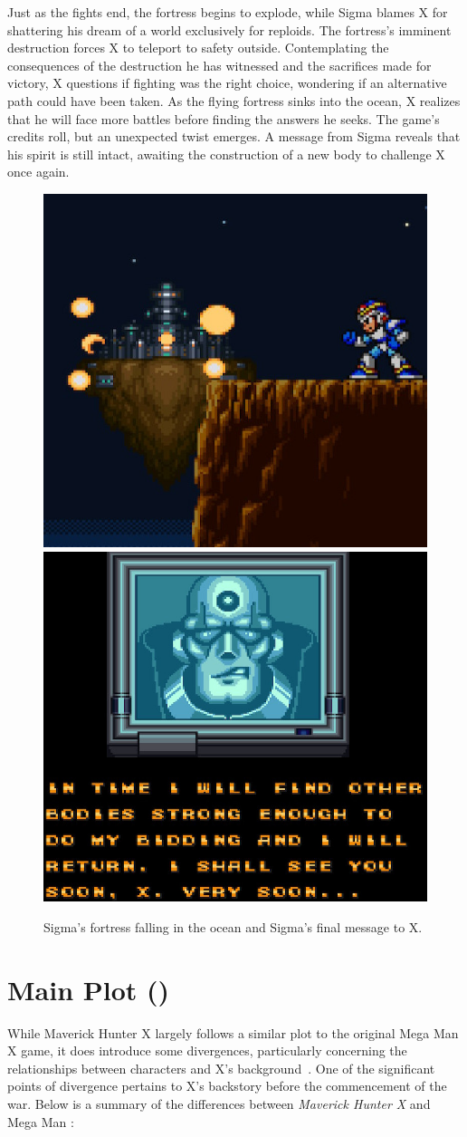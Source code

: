 Just as the fights end,  the fortress begins to explode, while Sigma blames X for shattering his dream of a world exclusively for reploids. The fortress's imminent destruction forces X to teleport to safety outside. Contemplating the consequences of the destruction he has witnessed and the sacrifices made for victory, X questions if fighting was the right choice, wondering if an alternative path could have been taken. As the flying fortress sinks into the ocean, X realizes that he will face more battles before finding the answers he seeks. The game's credits roll, but an unexpected twist emerges. A message from Sigma reveals that his spirit is still intact, awaiting the construction of a new body to challenge X once again. 
\begin{figure}[htp]
	\centering
	\includegraphics[width=0.45\linewidth]{figures/X1/Ending.jpg}
	\includegraphics[width=0.45\linewidth]{figures/X1/sigma_message.jpg}
	\caption{Sigma's fortress falling in the ocean and Sigma's final message to X.}
\end{figure}

\section{Main Plot (\mhx)}
While Maverick Hunter X largely follows a similar plot to the original Mega Man X game, it does introduce some divergences, particularly concerning the relationships between characters and X's background~\cite{wiki:MM_MHX}. One of the significant points of divergence pertains to X's backstory before the commencement of the war. Below is a summary of the differences between \textit{Maverick Hunter X} and Mega Man \x:


